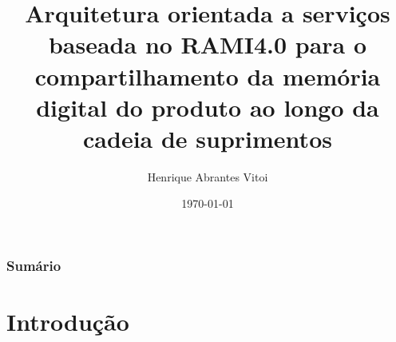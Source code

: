 \documentclass[10pt]{beamer}
\title{Arquitetura orientada a servi\c{c}os baseada no RAMI4.0 para o compartilhamento da mem\'{o}ria digital do produto ao longo da cadeia de suprimentos} %
\author{Henrique Abrantes Vitoi} %
\institute[Poli-USP] %
{
Escola Politécnica da Universidade de São Paulo \\
Engenharia de Controle e Automação Mecânica

}
\date{\today} %
\begin{document}
	

\begin{frame}
	\titlepage %
\end{frame}

\begin{frame}
	\frametitle{Sumário} %
	\tableofcontents %
\end{frame}

\section{Introdução}
\end{document}
